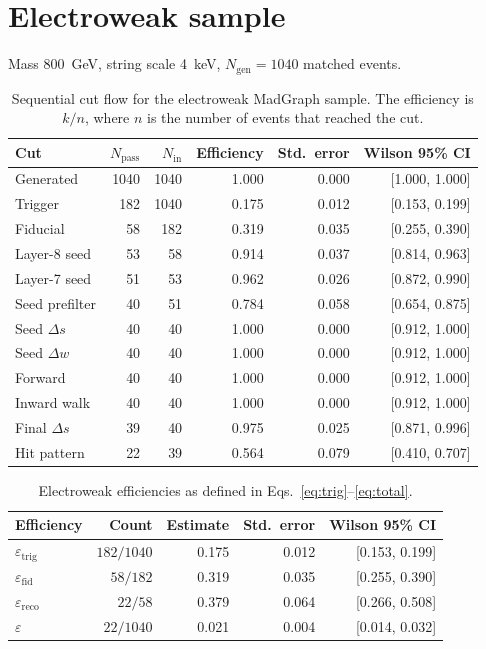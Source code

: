 \documentclass[11pt,a4paper]{article}
\begin{document}
\section{Electroweak sample}
\label{sec:ew}
Mass \SI{800}{\GeV}, string scale \SI{4}{\keV}, \(N_{\mathrm{gen}} = 1040\) matched events.

\begin{table}[H]
\centering
\caption{Sequential cut flow for the electroweak MadGraph sample. The efficiency is \(k/n\), where \(n\) is the number of events that reached the cut.}
\label{tab:ew-cuts}
\small
\begin{tabular}{lrrrrr}
\toprule
Cut & \(N_{\mathrm{pass}}\) & \(N_{\mathrm{in}}\) & Efficiency & Std.\ error & Wilson 95\% CI \\
\midrule
Generated & 1040 & 1040 & 1.000 & 0.000 & [1.000, 1.000] \\
Trigger & 182 & 1040 & 0.175 & 0.012 & [0.153, 0.199] \\
Fiducial & 58 & 182 & 0.319 & 0.035 & [0.255, 0.390] \\
Layer-8 seed & 53 & 58 & 0.914 & 0.037 & [0.814, 0.963] \\
Layer-7 seed & 51 & 53 & 0.962 & 0.026 & [0.872, 0.990] \\
Seed prefilter & 40 & 51 & 0.784 & 0.058 & [0.654, 0.875] \\
Seed \(\Delta s\) & 40 & 40 & 1.000 & 0.000 & [0.912, 1.000] \\
Seed \(\Delta w\) & 40 & 40 & 1.000 & 0.000 & [0.912, 1.000] \\
Forward & 40 & 40 & 1.000 & 0.000 & [0.912, 1.000] \\
Inward walk & 40 & 40 & 1.000 & 0.000 & [0.912, 1.000] \\
Final \(\Delta s\) & 39 & 40 & 0.975 & 0.025 & [0.871, 0.996] \\
Hit pattern & 22 & 39 & 0.564 & 0.079 & [0.410, 0.707] \\
\bottomrule
\end{tabular}
\end{table}

\begin{table}[H]
\centering
\caption{Electroweak efficiencies as defined in Eqs.~\eqref{eq:trig}--\eqref{eq:total}.}
\label{tab:ew-eff}
\begin{tabular}{lrrrr}
\toprule
Efficiency & Count & Estimate & Std.\ error & Wilson 95\% CI \\
\midrule
\(\varepsilon_{\mathrm{trig}}\) & $182/1040$ & 0.175 & 0.012 & [0.153, 0.199] \\
\(\varepsilon_{\mathrm{fid}}\) & $58/182$ & 0.319 & 0.035 & [0.255, 0.390] \\
\(\varepsilon_{\mathrm{reco}}\) & $22/58$ & 0.379 & 0.064 & [0.266, 0.508] \\
\(\varepsilon\) & $22/1040$ & 0.021 & 0.004 & [0.014, 0.032] \\
\bottomrule
\end{tabular}
\end{table}
\end{document}
